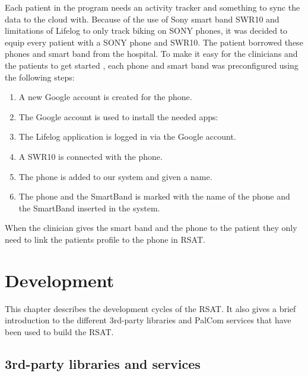 \documentclass{cslthse-msc}
\begin{document}
Each patient in the program needs an activity tracker and something to sync the data to the cloud with. Because of the use of Sony smart band SWR10 and limitations of Lifelog to only track biking on SONY phones, it was decided to equip every patient with a SONY phone and SWR10. The patient borrowed these phones and smart band from the hospital. To make it easy for the clinicians and the patients to get started , each phone and smart band was preconfigured using the following steps:

\begin{enumerate}
    \item{A new Google account is created for the phone.}
    \item{The Google account is used to install the needed apps:
}
    \item{The Lifelog application is logged in via the Google account.}
   \item{A SWR10 is connected with the phone.}
    \item{The phone is added to our system and given a name.}
    \item{The phone and the SmartBand is marked with the name of the phone and the SmartBand inserted in the system.}
\end{enumerate}

When the clinician gives the smart band and the phone to the patient they only need to link the patients profile to the phone in RSAT. %


\chapter{Development}
This chapter describes the development cycles of the RSAT. It also gives a brief introduction to the different 3rd-party libraries and PalCom services that have been used to build the RSAT.

\section{3rd-party libraries and services}
\end{document}
